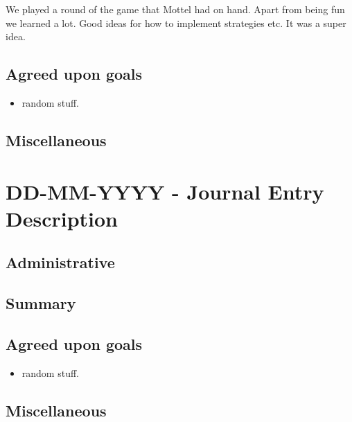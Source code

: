 \documentclass[12pt]{article}
\begin{document}
	We played a round of the game that Mottel had on hand. Apart from being fun we learned a lot. Good ideas for how to implement strategies etc. It was a super idea.
	
	
	\subsection{Agreed upon goals}
	\begin{itemize}
		\item random stuff.
	\end{itemize}
	
	\subsection{Miscellaneous}
	
	\pagebreak
	
	\section{DD-MM-YYYY - Journal Entry Description}
	
	\subsection{Administrative}
	
	\subsection{Summary}
	
	\subsection{Agreed upon goals}
	\begin{itemize}
		\item random stuff.
	\end{itemize}
	
	\subsection{Miscellaneous}
	
	\pagebreak
	
\end{document}
